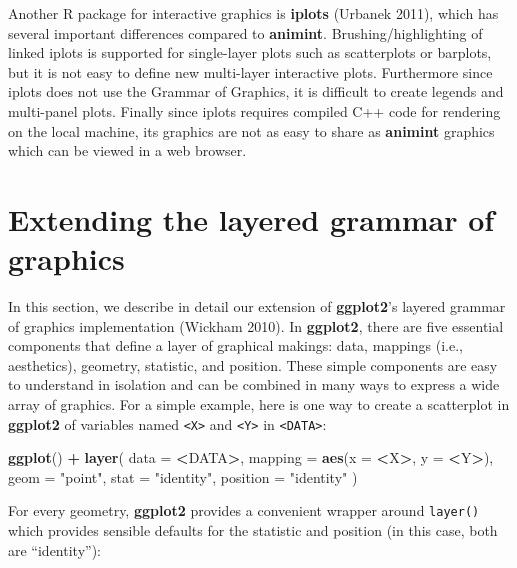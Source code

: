 \documentclass[12pt,]{article}
\newenvironment{Shaded}{\begin{snugshade}}{\end{snugshade}}
\newcommand{\DataTypeTok}[1]{\textcolor[rgb]{0.13,0.29,0.53}{#1}}
\newcommand{\KeywordTok}[1]{\textcolor[rgb]{0.13,0.29,0.53}{\textbf{#1}}}
\newcommand{\NormalTok}[1]{#1}
\newcommand{\OperatorTok}[1]{\textcolor[rgb]{0.81,0.36,0.00}{\textbf{#1}}}
\newcommand{\StringTok}[1]{\textcolor[rgb]{0.31,0.60,0.02}{#1}}
\theoremstyle{definition}
\theoremstyle{definition}
\theoremstyle{definition}
\theoremstyle{remark}
\begin{document}
Another R package for interactive graphics is \textbf{iplots} (Urbanek
2011), which has several important differences compared to
\textbf{animint}. Brushing/highlighting of linked iplots is supported
for single-layer plots such as scatterplots or barplots, but it is not
easy to define new multi-layer interactive plots. Furthermore since
iplots does not use the Grammar of Graphics, it is difficult to create
legends and multi-panel plots. Finally since iplots requires compiled
C++ code for rendering on the local machine, its graphics are not as
easy to share as \textbf{animint} graphics which can be viewed in a web
browser.

\hypertarget{extending-the-layered-grammar-of-graphics}{%
\section{Extending the layered grammar of
graphics}\label{extending-the-layered-grammar-of-graphics}}

In this section, we describe in detail our extension of
\textbf{ggplot2}'s layered grammar of graphics implementation (Wickham
2010). In \textbf{ggplot2}, there are five essential components that
define a layer of graphical makings: data, mappings (i.e., aesthetics),
geometry, statistic, and position. These simple components are easy to
understand in isolation and can be combined in many ways to express a
wide array of graphics. For a simple example, here is one way to create
a scatterplot in \textbf{ggplot2} of variables named
\texttt{\textless{}X\textgreater{}} and
\texttt{\textless{}Y\textgreater{}} in
\texttt{\textless{}DATA\textgreater{}}:

\begin{Shaded}
\begin{Highlighting}[]
\KeywordTok{ggplot}\NormalTok{() }\OperatorTok{+}\StringTok{ }\KeywordTok{layer}\NormalTok{(}
  \DataTypeTok{data =} \OperatorTok{<}\NormalTok{DATA}\OperatorTok{>}\NormalTok{, }
  \DataTypeTok{mapping =} \KeywordTok{aes}\NormalTok{(}\DataTypeTok{x =} \OperatorTok{<}\NormalTok{X}\OperatorTok{>}\NormalTok{, }\DataTypeTok{y =} \OperatorTok{<}\NormalTok{Y}\OperatorTok{>}\NormalTok{), }
  \DataTypeTok{geom =} \StringTok{"point"}\NormalTok{, }
  \DataTypeTok{stat =} \StringTok{"identity"}\NormalTok{,}
  \DataTypeTok{position =} \StringTok{"identity"}
\NormalTok{)}
\end{Highlighting}
\end{Shaded}

For every geometry, \textbf{ggplot2} provides a convenient wrapper
around \texttt{layer()} which provides sensible defaults for the
statistic and position (in this case, both are ``identity''):
\end{document}

